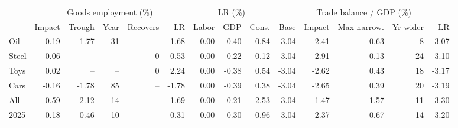 \begin{tabular}{lrrrrrrrrrrrrr}
\toprule
 & \multicolumn{5}{c}{Goods employment (\%)} & \multicolumn{3}{c}{LR (\%)} & \multicolumn{5}{c}{Trade balance / GDP (\%)} \\
\cmidrule(lr){2-6}\cmidrule(lr){7-9}\cmidrule(lr){10-14}
 & Impact & Trough & Year & Recovers & LR & Labor & GDP & Cons. & Base & Impact & Max narrow. & Yr wider & LR \\
\midrule
Oil & -0.19 & -1.77 & 31 & -- & -1.68 & 0.00 & 0.40 & 0.84 & -3.04 & -2.41 & 0.63 & 8 & -3.07 \\
Steel & 0.06 & -- & -- & 0 & 0.53 & 0.00 & -0.22 & 0.12 & -3.04 & -2.91 & 0.13 & 24 & -3.10 \\
Toys & 0.02 & -- & -- & 0 & 2.24 & 0.00 & -0.38 & 0.54 & -3.04 & -2.62 & 0.43 & 18 & -3.17 \\
Cars & -0.16 & -1.78 & 85 & -- & -1.78 & 0.00 & -0.39 & 0.38 & -3.04 & -2.65 & 0.39 & 20 & -3.19 \\
All & -0.59 & -2.12 & 14 & -- & -1.69 & 0.00 & -0.21 & 2.53 & -3.04 & -1.47 & 1.57 & 11 & -3.30 \\
2025 & -0.18 & -0.46 & 10 & -- & -0.31 & 0.00 & -0.30 & 0.96 & -3.04 & -2.37 & 0.67 & 14 & -3.20 \\
\bottomrule
\end{tabular}

